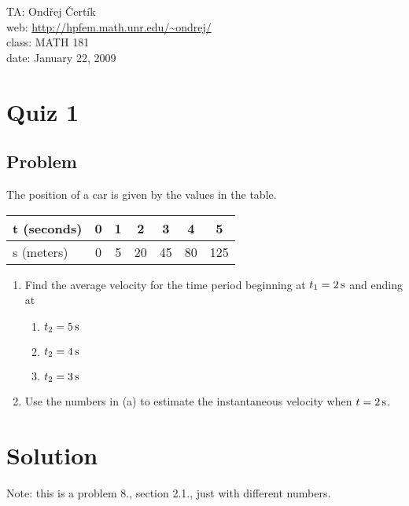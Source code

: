 \documentclass[10pt]{article}
\begin{document}
\noindent TA: Ondřej Čertík\\
web: \url{http://hpfem.math.unr.edu/~ondrej/}\\
class: MATH 181\\
date: January 22, 2009

\section*{Quiz 1}

\subsection*{Problem}

The position of a car is given by the values in the table.

\begin{tabular}{|l||c|c|c|c|c|c|}
\hline
t (seconds) & 0   & 1  & 2  & 3  & 4 & 5 \\ \hline
s (meters) & 0 & 5 & 20 & 45 & 80 & 125 \\
\hline
\end{tabular}

\renewcommand{\labelenumi}{(\alph{enumi})}
\renewcommand{\labelenumii}{(\roman{enumii})}
\begin{enumerate}
\item
Find the average velocity for the time period beginning at $t_1 = 2\rm\,s$ and
ending at
\begin{enumerate}
\item $t_2=5\rm\,s$
\item $t_2=4\rm\,s$
\item $t_2=3\rm\,s$
\end{enumerate}

\item
Use the numbers in (a) to estimate the instantaneous velocity when
$t=2\rm\,s$.
\end{enumerate}

\section*{Solution}

Note: this is a problem 8., section 2.1., just with different numbers.
\end{document}
